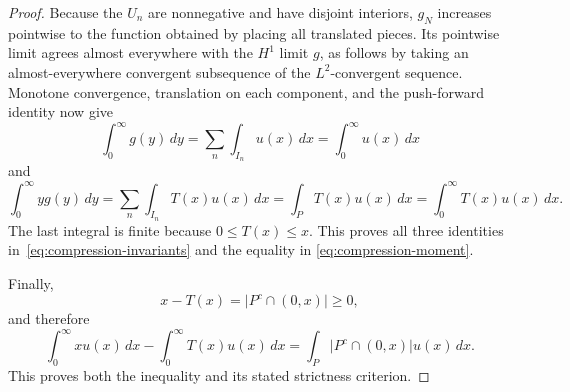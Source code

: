 \documentclass[11pt]{article}
\theoremstyle{definition}
\theoremstyle{remark}
\begin{document}
\begin{proof}
Because the $U_n$ are nonnegative and have disjoint interiors, $g_N$ increases
pointwise to the function obtained by placing all translated pieces. Its
pointwise limit agrees almost everywhere with the $H^1$ limit $g$, as follows
by taking an almost-everywhere convergent subsequence of the $L^2$-convergent
sequence. Monotone convergence, translation on each component, and the
push-forward identity now give
\[
 \int_0^\infty g(y)\,dy
 =\sum_n\int_{I_n}u(x)\,dx
 =\int_0^\infty u(x)\,dx
\]
and
\[
 \int_0^\infty yg(y)\,dy
 =\sum_n\int_{I_n}T(x)u(x)\,dx
 =\int_P T(x)u(x)\,dx
 =\int_0^\infty T(x)u(x)\,dx.
\]
The last integral is finite because $0\leq T(x)\leq x$. This proves all three
identities in~\eqref{eq:compression-invariants} and the equality in
\eqref{eq:compression-moment}.

Finally,
\[
 x-T(x)=\bigl|P^c\cap(0,x)\bigr|\geq0,
\]
and therefore
\[
 \int_0^\infty xu(x)\,dx-\int_0^\infty T(x)u(x)\,dx
 =\int_P\bigl|P^c\cap(0,x)\bigr|u(x)\,dx.
\]
This proves both the inequality and its stated strictness criterion.
\end{proof}
\end{document}
